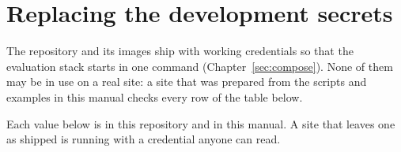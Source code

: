 \documentclass[11pt, a4paper]{article}
\begin{document}
\section{Replacing the development secrets}
\label{sec:secrets}

The repository and its images ship with working credentials so that the evaluation stack
starts in one command (Chapter~\ref{sec:compose}). None of them may be in use on a real site:
a site that was prepared from the scripts and examples in this manual checks every row of the
table below.

\begin{elicitsecurity}
Each value below is in this repository and in this manual. A site that leaves one as shipped
is running with a credential anyone can read.
\end{elicitsecurity}
\end{document}
